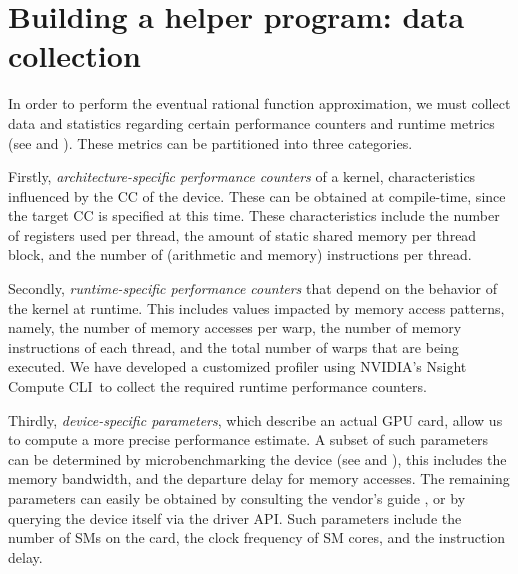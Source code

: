 \section{Building a helper program: data collection}
\label{sec:data_collection}
In order to perform the eventual rational
function approximation, 
we must collect data and statistics regarding certain performance counters and runtime
metrics (see \cite{DBLP:conf/isca/HongK09} and \cite{cuda2015}).
These metrics can be partitioned into three categories.

Firstly, \textit{architecture-specific performance counters} of a kernel,
characteristics influenced by the CC of the device.
These can be obtained at compile-time, since the target CC is specified at this time.
These characteristics include the number of registers used per thread,
the amount of static shared memory %
per thread block, and the number of (arithmetic and memory)
instructions per thread.

Secondly, \textit{runtime-specific performance counters} that depend on
the behavior of the kernel at runtime.
This includes values impacted by memory access patterns, namely, 
the number of memory accesses per warp, the number of memory instructions of each thread,
and the total number of warps that are being executed.
We have developed a customized profiler using NVIDIA's Nsight Compute CLI\
to collect the required runtime performance counters. 

Thirdly, \textit{device-specific parameters}, which
describe an actual GPU card, allow us to compute
a more precise performance estimate.
A subset of such parameters can be determined by microbenchmarking 
the device (see \cite{DBLP:journals/tpds/MeiC17} and \cite{DBLP:conf/ispass/WongPSM10}),
this includes the memory bandwidth, 
and the departure delay for memory accesses.
The remaining parameters can easily be obtained
by consulting the vendor's guide \cite{cuda2019guide}, 
or by querying the device itself via the {{\cuda} driver API}.
Such parameters include the number of SMs on the card, 
the clock frequency of SM cores, and the instruction delay.


